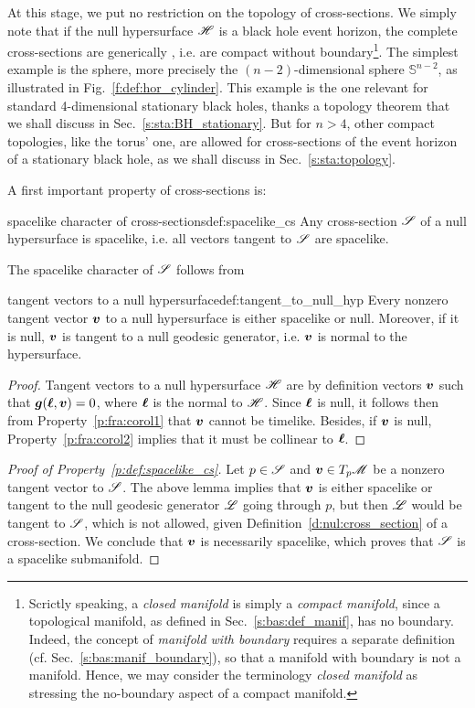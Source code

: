 At this stage, we put no restriction on the topology of cross-sections.
We simply note that if the null hypersurface $\mathscr{H}$ is a black hole event
horizon, the complete cross-sections are generically
, i.e.
are compact without boundary\footnote{Scrictly speaking, a
\emph{closed manifold} is simply a \emph{compact manifold},
since a topological manifold, as defined in Sec.~\ref{s:bas:def_manif},
has no boundary. Indeed, the concept of \emph{manifold with boundary} requires
a separate definition (cf. Sec.~\ref{s:bas:manif_boundary}),
so that a manifold with boundary is not a manifold.
Hence, we may consider the terminology \emph{closed manifold}
as stressing the no-boundary aspect of a compact manifold.}.
The simplest example is the sphere,
more precisely the $(n-2)$-dimensional sphere $\mathbb{S}^{n-2}$,
as illustrated in Fig.~\ref{f:def:hor_cylinder}.
This example is the one relevant for standard 4-dimensional
stationary black holes, thanks a topology theorem that
we shall discuss in Sec.~\ref{s:sta:BH_stationary}.
But for $n > 4$, other
compact topologies, like the torus' one, are allowed for
cross-sections of the event horizon of a stationary black hole, as we
shall discuss in Sec.~\ref{s:sta:topology}.

A first important property of cross-sections is:

\begin{tprop}{spacelike character of cross-sections}{def:spacelike_cs}
Any cross-section $\mathscr{S}$ of a null hypersurface is spacelike,
i.e. all vectors tangent to $\mathscr{S}$ are spacelike.
\end{tprop}
The spacelike character of $\mathscr{S}$ follows from
\begin{tlemma}{tangent vectors to a null hypersurface}{def:tangent_to_null_hyp}
Every nonzero tangent vector $\bm{v}$ to a null hypersurface is either spacelike or null.
Moreover, if it is null, $\bm{v}$ is tangent to a null geodesic generator, i.e. $\bm{v}$ is normal
to the hypersurface.
\end{tlemma}

\begin{proof}
Tangent vectors to a null hypersurface $\mathscr{H}$ are by definition
vectors $\bm{v}$ such that $\bm{g}(\bm{\ell},\bm{v})=0$, where $\bm{\ell}$ is the normal
to $\mathscr{H}$. Since $\bm{\ell}$ is null, it follows then from Property~\ref{p:fra:corol1}
that $\bm{v}$ cannot be timelike.
Besides, if $\bm{v}$ is null, Property~\ref{p:fra:corol2}
implies that it must be collinear to $\bm{\ell}$.
\end{proof}
\begin{proof}[Proof of Property~\ref{p:def:spacelike_cs}]
Let $p \in \mathscr{S}$ and $\bm{v}\in T_p\mathscr{M}$ be a nonzero tangent vector to $\mathscr{S}$.
The above lemma implies that $\bm{v}$ is either spacelike or tangent to the
null geodesic generator $\mathscr{L}$ going through $p$, but then $\mathscr{L}$ would be tangent to $\mathscr{S}$,
which is not allowed, given Definition~\ref{d:nul:cross_section} of a cross-section. We conclude
that $\bm{v}$ is necessarily spacelike, which proves that $\mathscr{S}$ is a spacelike
submanifold.
\end{proof}

